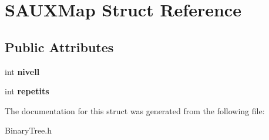 \hypertarget{struct_s_a_u_x_map}{}\section{S\+A\+U\+X\+Map Struct Reference}
\label{struct_s_a_u_x_map}
\subsection*{Public Attributes}
\begin{DoxyCompactItemize}
\item 
\hypertarget{struct_s_a_u_x_map_a102615bad2661b642b700cf8a93d58c0}{}int {\bfseries nivell}\label{struct_s_a_u_x_map_a102615bad2661b642b700cf8a93d58c0}

\item 
\hypertarget{struct_s_a_u_x_map_a93926509a315f817ba97ab9081d77911}{}int {\bfseries repetits}\label{struct_s_a_u_x_map_a93926509a315f817ba97ab9081d77911}

\end{DoxyCompactItemize}


The documentation for this struct was generated from the following file\+:\begin{DoxyCompactItemize}
\item 
Binary\+Tree.\+h\end{DoxyCompactItemize}
